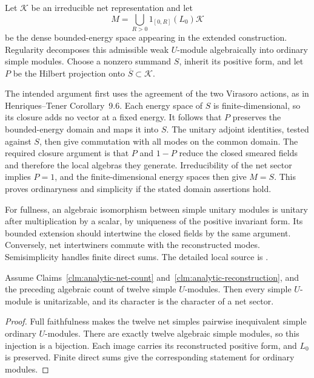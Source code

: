 Let $\mathcal K$ be an irreducible net representation and let
\[
 M=\bigcup_{R>0}1_{[0,R]}(L_0)\mathcal K
\]
be the dense bounded-energy space appearing in the extended construction.
Regularity decomposes this admissible weak $U$-module algebraically into
ordinary simple modules.  Choose a nonzero summand $S$, inherit its
positive form, and let $P$ be the Hilbert projection onto
$\overline S\subset\mathcal K$.

The intended argument first uses the agreement of the two Virasoro
actions, as in Henriques--Tener Corollary~9.6.  Each energy space of $S$
is finite-dimensional, so its closure adds no vector at a fixed energy.
It follows that $P$ preserves the bounded-energy domain and maps it
into $S$.  The unitary adjoint identities, tested against $S$, then give
commutation with all modes on the common domain.  The required closure
argument is that $P$ and $1-P$ reduce the closed smeared fields and
therefore the local algebras they generate.  Irreducibility of the net
sector implies $P=1$, and the finite-dimensional energy spaces then
give $M=S$.  This proves ordinaryness and simplicity if the stated
domain assertions hold.

For fullness, an algebraic isomorphism between simple unitary modules is
unitary after multiplication by a scalar, by uniqueness of the positive
invariant form.  Its bounded extension should intertwine the closed
fields by the same argument.  Conversely, net intertwiners commute with
the reconstructed modes.  Semisimplicity handles finite direct sums.
The detailed local source is
.

\begin{proposition}
\label{prop:analytic-strong-unitarity}
Assume Claims~\ref{clm:analytic-net-count}
and~\ref{clm:analytic-reconstruction}, and the preceding algebraic
count of twelve simple $U$-modules.  Then every simple $U$-module is
unitarizable, and its character is the character of a net sector.
\end{proposition}
\begin{proof}
Full faithfulness makes the twelve net simples pairwise inequivalent
simple ordinary $U$-modules.  There are exactly twelve algebraic simple
modules, so this injection is a bijection.  Each image carries its
reconstructed positive form, and $L_0$ is preserved.  Finite direct sums
give the corresponding statement for ordinary modules.
\end{proof}

